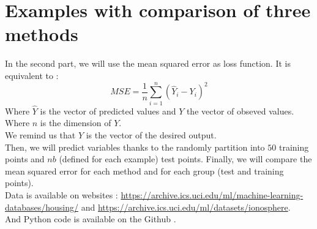 \documentclass{article}
\begin{document}

\section{Examples with comparison of three methods}
In the second part, we will use the mean squared error as loss function. It is equivalent to :
 \[MSE = \frac{1}{n} \sum_{i=1}^n (\hat{Y}_i-Y_i)^2\]
 Where $\hat{Y}$ is the vector of predicted values and $Y$ the vector of obseved values. Where $n$ is the dimension of $Y$.\\
 We remind us that $Y$ is the vector of the desired output.\\
 Then, we will predict variables thanks to the randomly partition into $50$ training points and $nb$ (defined for each example) test points. Finally, we will compare the mean squared error for each method and for each group (test and training points).\\
 Data is available on websites : \href{https://archive.ics.uci.edu/ml/machine-learning-databases/housing/}{https://archive.ics.uci.edu/ml/machine-learning-databases/housing/}\cite{house} and \href{https://archive.ics.uci.edu/ml/datasets/ionosphere}{https://archive.ics.uci.edu/ml/datasets/ionosphere}\cite{iono}. \\
 And Python code is available on the Github \cite{code}.

\end{document}
